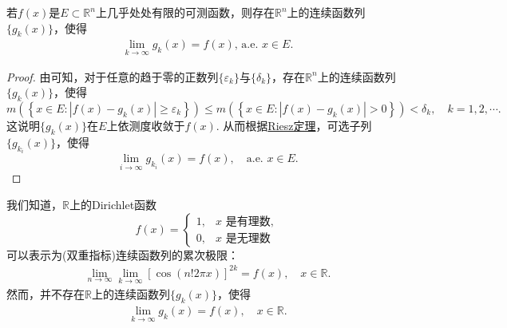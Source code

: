 \documentclass[../../main.tex]{subfiles}%
\begin{document}
\begin{corollary}\label{corollary:推论3.20}
若\(f(x)\)是\(E \subset \mathbb{R}^{n}\)上几乎处处有限的可测函数，则存在\(\mathbb{R}^{n}\)上的连续函数列\(\{g_{k}(x)\}\)，使得
\begin{align*}
\lim_{k \to \infty} g_{k}(x) = f(x), \,\text{a.e. } x \in E. 
\end{align*}
\end{corollary}
\begin{proof}

由可知，对于任意的趋于零的正数列\(\{\varepsilon_{k}\}\)与\(\{\delta_{k}\}\)，存在\(\mathbb{R}^{n}\)上的连续函数列\(\{g_{k}(x)\}\)，使得
\[
m\left( \left\{ x\in E:\left| f\left( x \right) -g_k\left( x \right) \right|\geqslant \varepsilon _k \right\} \right) \leqslant m\left( \left\{ x\in E:\left| f\left( x \right) -g_k\left( x \right) \right|>0 \right\} \right) <\delta _k,\quad k=1,2,\cdots .
\]
这说明\(\{g_{k}(x)\}\)在\(E\)上依测度收敛于\(f(x)\). 从而根据\hyperref[theorem:Riesz定理]{Riesz定理}，可选子列\(\{g_{k_{i}}(x)\}\)，使得
\[\lim_{i \to \infty} g_{k_{i}}(x) = f(x), \quad \text{a.e. } x \in E.\] 

\end{proof}
\begin{remark}
我们知道，\(\mathbb{R}\)上的Dirichlet函数
\[f(x)=
\begin{cases}
1, & x\text{ 是有理数},\\
0, & x\text{ 是无理数}
\end{cases}\]
可以表示为(双重指标)连续函数列的累次极限：
\begin{align*}
\lim_{n \to \infty}\lim_{k \to \infty}[\cos(n!2\pi x)]^{2k}=f(x),\quad x\in\mathbb{R}.
\end{align*}
然而，并不存在\(\mathbb{R}\)上的连续函数列\(\{g_{k}(x)\}\)，使得
\begin{align*}
\lim_{k \to \infty}g_{k}(x)=f(x),\quad x\in\mathbb{R}.
\end{align*} 
\end{remark}
\end{document}

